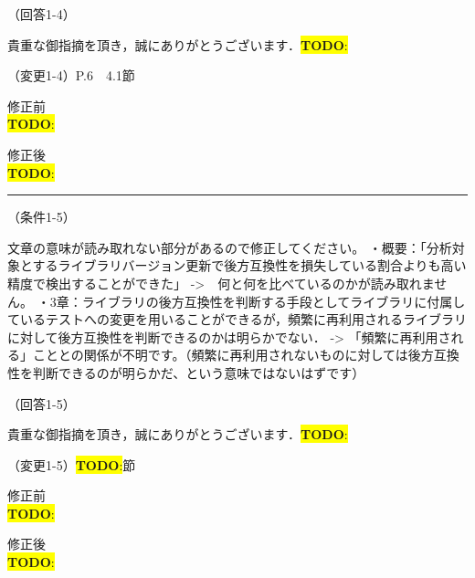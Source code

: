 \documentclass{jarticle} %
\newcommand{\todo}[1]{\colorbox{yellow}{{\bf TODO}:}{\color{red}{\textbf{[#1]}}}}
\def\subsection#1{ \vspace{1pc} {\gt #1} }
\def\nextans{ \vspace{2pc} \hrule }
\begin{document}
\subsection{（回答1-4）}

貴重な御指摘を頂き，誠にありがとうございます．\todo{hoge}



\newpage
\subsection{（変更1-4）P.6　4.1節}
\vspace{-0.3cm}
\begin{description}
\item 修正前\\
\phantom{　}
\todo{hoge}
\vspace{-0.3cm}
\item 修正後\\
\phantom{　}
\todo{hoge}
\end{description}


\newpage
\nextans
\subsection{（条件1-5）}

文章の意味が読み取れない部分があるので修正してください。
・概要：「分析対象とするライブラリバージョン更新で後方互換性を損失している割合よりも高い精度で検出することができた」
->　何と何を比べているのかが読み取れません。
・3章：ライブラリの後方互換性を判断する手段としてライブラリに付属しているテストへの変更を用いることができるが，頻繁に再利用されるライブラリに対して後方互換性を判断できるのかは明らかでない．
-> 「頻繁に再利用される」こととの関係が不明です。（頻繁に再利用されないものに対しては後方互換性を判断できるのが明らかだ、という意味ではないはずです）

\subsection{（回答1-5）}

貴重な御指摘を頂き，誠にありがとうございます．\todo{hoge}



\newpage
\subsection{（変更1-5）\todo{hoge}節}
\vspace{-0.3cm}
\begin{description}
\item 修正前\\
\phantom{　}
\todo{hoge}
\vspace{-0.3cm}
\item 修正後\\
\phantom{　}
\todo{hoge}
\end{description}
\end{document}
